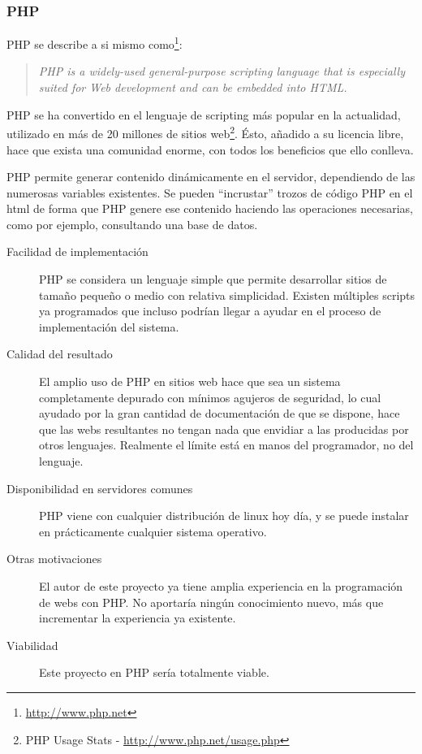 \subsubsection{PHP}
PHP se describe a si mismo como\footnote{\url{http://www.php.net}}:
\begin{quote}
\emph{PHP  is a widely-used general-purpose scripting language that is especially suited for Web development and can be embedded into HTML.}
\end{quote}

PHP se ha convertido en el lenguaje de scripting más popular en la actualidad, utilizado en más de 20 millones de sitios web\footnote{PHP Usage Stats - \url{http://www.php.net/usage.php}}. Ésto, añadido a su licencia libre, hace que exista una comunidad enorme, con todos los beneficios que ello conlleva.

PHP permite generar contenido dinámicamente en el servidor, dependiendo de las numerosas variables existentes. Se pueden ``incrustar'' trozos de código PHP en el html de forma que PHP genere ese contenido haciendo las operaciones necesarias, como por ejemplo, consultando una base de datos.

\begin{description}
	\item[Facilidad de implementación] PHP se considera un lenguaje simple que permite desarrollar sitios de tamaño pequeño o medio con relativa simplicidad. Existen múltiples scripts ya programados que incluso podrían llegar a ayudar en el proceso de implementación del sistema.
	\item[Calidad del resultado] El amplio uso de PHP en sitios web hace que sea un sistema completamente depurado con mínimos agujeros de seguridad, lo cual ayudado por la gran cantidad de documentación de que se dispone, hace que las webs resultantes no tengan nada que envidiar a las producidas por otros lenguajes. Realmente el límite está en manos del programador, no del lenguaje.
	\item[Disponibilidad en servidores comunes] PHP viene con cualquier distribución de linux hoy día, y se puede instalar en prácticamente cualquier sistema operativo.
	\item[Otras motivaciones] El autor de este proyecto ya tiene amplia experiencia en la programación de webs con PHP. No aportaría ningún conocimiento nuevo, más que incrementar la experiencia ya existente.
	\item[Viabilidad] Este proyecto en PHP sería totalmente viable.
\end{description}

